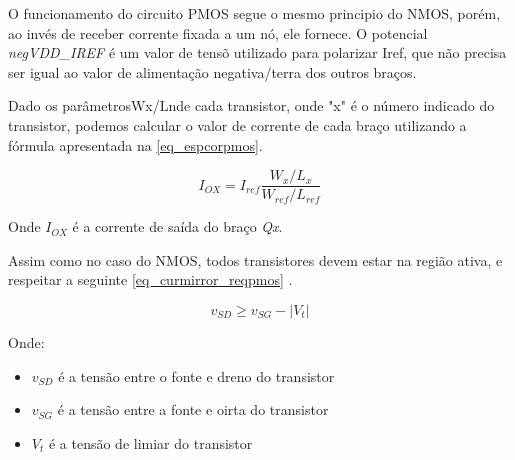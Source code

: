 O funcionamento do circuito PMOS segue o mesmo principio do NMOS, porém, ao inv\'es de receber corrente fixada a um n\'o, ele fornece. O potencial \emph{negVDD\_IREF} \'e um valor de tens\~o utilizado para polarizar Iref, que n\~ao precisa ser igual ao valor de alimenta{\c c}\~ao negativa/terra dos outros bra{\c c}os.

Dado os parâmetrosWx/Lnde cada transistor, onde "x" é o número indicado do transistor, podemos calcular o valor de corrente de cada braço utilizando a fórmula apresentada na \autoref{eq_espcorpmos}.

\begin{equation}
    \label{eq_espcorpmos}
    I_{OX} = I_{ref}\frac{W_x/L_x}{W_{ref}/L_{ref}}
\end{equation}

Onde $I_{OX}$ \'e a corrente de sa\'ida do bra{\c c}o \emph{Qx}. 

Assim como no caso do NMOS, todos transistores devem estar na regi\~ao ativa, e respeitar a seguinte \autoref{eq_curmirror_reqpmos} \cite{RazaviFundM}.

\begin{equation}
    \label{eq_curmirror_reqpmos}
    v_{SD} \geq v_{SG} - |V_t|
\end{equation}

Onde:

\begin{itemize}
    \item $v_{SD}$ \'e a tens\~ao entre o fonte e dreno do transistor
    \item $v_{SG}$ \'e a tens\~ao entre a fonte e oirta do transistor
    \item $V_{t}$ \'e a tens\~ao de limiar do transistor
\end{itemize}

